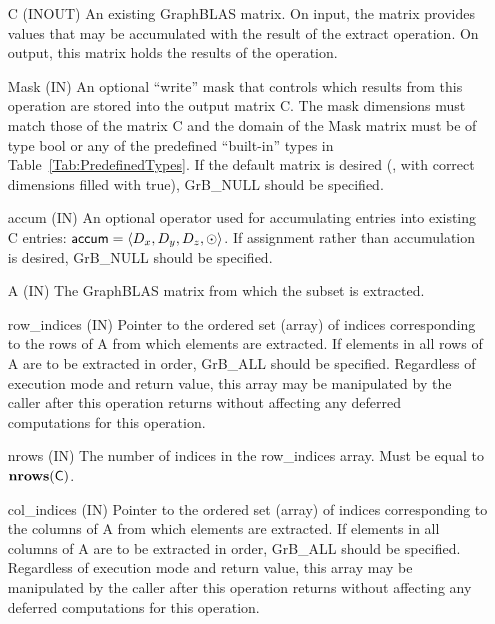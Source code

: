\begin{itemize}[leftmargin=1in]
    \item[{\sf C}]     ({\sf INOUT}) An existing GraphBLAS matrix.  On input,
    the matrix provides values that may be accumulated with the result of the
    extract operation.  On output, this matrix holds the results of the
    operation.

    \item[{\sf Mask}] ({\sf IN}) An optional ``write'' mask that controls which
    results from this operation are stored into the output matrix {\sf C}. The 
    mask dimensions must match those of the matrix {\sf C} and the domain of the 
    {\sf Mask} matrix must be of type {\sf bool} or any of the predefined 
    ``built-in'' types in Table~\ref{Tab:PredefinedTypes}.  If the default
    matrix is desired (\ie, with correct dimensions filled with {\sf true}), 
    {\sf GrB\_NULL} should be specified.

    \item[{\sf accum}] ({\sf IN})  An optional operator used for accumulating
    entries into existing {\sf C} entries: ${\sf accum} = \langle D_x,
    D_y, D_z,\odot \rangle$. If assignment rather than accumulation is
    desired, {\sf GrB\_NULL} should be specified.

    \item[{\sf A}]     ({\sf IN})  The GraphBLAS matrix from which the subset
    is extracted.

    \item[{\sf row\_indices}] ({\sf IN}) Pointer to the ordered set (array) of 
    indices corresponding to the rows of {\sf A} from which elements are 
    extracted.  If elements in all rows of {\sf A} are to be extracted in order, 
    {\sf GrB\_ALL} should be specified.  Regardless of execution mode and return
    value, this array may be manipulated by the caller after this operation 
    returns without affecting any deferred computations for this operation.
    
    \item[{\sf nrows}] ({\sf IN}) The number of indices in the {\sf row\_indices}
    array.  Must be equal to $\bold{nrows}({\sf C})$.
    
    \item[{\sf col\_indices}] ({\sf IN}) Pointer to the ordered set (array) of 
    indices corresponding to the columns of {\sf A} from which elements are 
    extracted.  If elements in all columns of {\sf A} are to be extracted in order, 
    {\sf GrB\_ALL} should be specified.  Regardless of execution mode and return
    value, this array may be manipulated by the caller after this operation 
    returns without affecting any deferred computations for this operation.
    

\end{itemize}

